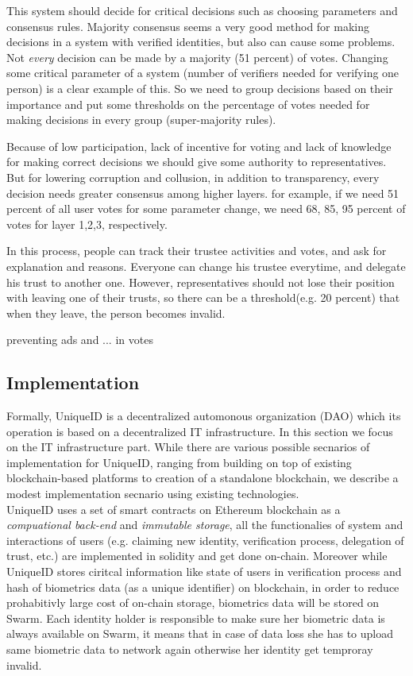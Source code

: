 \documentclass[conference]{IEEEtran}
\begin{document}
This system should decide for critical decisions such as choosing parameters and consensus rules. Majority consensus seems a very good method for making decisions in a system with verified identities, but also can cause some problems. Not \textit{every} decision can be made by a majority (51 percent) of votes. Changing some critical parameter of a system (number of verifiers needed for verifying one person) is a clear example of this. So we need to group decisions based on their importance and put some thresholds on the percentage of votes needed for making decisions in every group (super-majority rules).


Because of low participation, lack of incentive for voting and lack of knowledge for making correct decisions we should give some authority to representatives. But for lowering corruption and collusion, in addition to transparency, every decision needs greater consensus among higher layers. for example, if we need 51 percent of all user votes for some parameter change, we need 68, 85, 95 percent  of votes for layer 1,2,3, respectively.


In this process, people can track their trustee activities and votes, and ask for explanation and reasons. Everyone can change his trustee everytime, and delegate his trust to another one. However, representatives should not lose their position with leaving one of their trusts, so there can be a threshold(e.g. 20 percent) that when they leave, the person becomes invalid. 


preventing ads and ... in votes\\

\subsection{Implementation}
Formally, UniqueID is a decentralized automonous organization (DAO) which its operation is based on a decentralized IT infrastructure. In this section we focus on the IT infrastructure part. While there are various possible secnarios of implementation for UniqueID, ranging from building on top of existing blockchain-based platforms to creation of a standalone blockchain, we describe a modest implementation secnario using existing technologies.\\

UniqueID uses a set of smart contracts on Ethereum blockchain as a \textit{compuational back-end} and \textit{immutable storage}, all the functionalies of system and interactions of users (e.g. claiming new identity, verification process, delegation of trust, etc.) are implemented in solidity and get done on-chain. Moreover while UniqueID stores ciritcal information like state of users in verification process and hash of biometrics data (as a unique identifier) on blockchain, in order to reduce prohabitivly large cost of on-chain storage, biometrics data will be stored on Swarm. Each identity holder is responsible to make sure her biometric data is always available on Swarm, it means that in case of data loss she has to upload same biometric data to network again otherwise her identity get temproray invalid.
\end{document}
